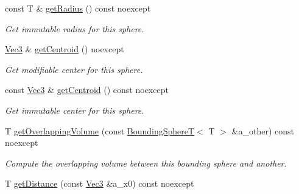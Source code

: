 \begin{DoxyCompactItemize}
\mbox{\label{classBoundingVolumes_1_1BoundingSphereT_affac2a4ac0cefaada01c5532eb13f26a}} 
const T \& \hyperlink{classBoundingVolumes_1_1BoundingSphereT_affac2a4ac0cefaada01c5532eb13f26a}{get\+Radius} () const noexcept
\begin{DoxyCompactList}\small\item\em Get immutable radius for this sphere. \end{DoxyCompactList}\item 
\mbox{\label{classBoundingVolumes_1_1BoundingSphereT_ac3adb87ea4da98d70375e5806e8dfdc5}} 
\hyperlink{classBoundingVolumes_1_1BoundingSphereT_ad89ed315255abcde216e9ca1de3068ab}{Vec3} \& \hyperlink{classBoundingVolumes_1_1BoundingSphereT_ac3adb87ea4da98d70375e5806e8dfdc5}{get\+Centroid} () noexcept
\begin{DoxyCompactList}\small\item\em Get modifiable center for this sphere. \end{DoxyCompactList}\item 
\mbox{\label{classBoundingVolumes_1_1BoundingSphereT_a62e38a048c7aacd79aec8dcc251e3a65}} 
const \hyperlink{classBoundingVolumes_1_1BoundingSphereT_ad89ed315255abcde216e9ca1de3068ab}{Vec3} \& \hyperlink{classBoundingVolumes_1_1BoundingSphereT_a62e38a048c7aacd79aec8dcc251e3a65}{get\+Centroid} () const noexcept
\begin{DoxyCompactList}\small\item\em Get immutable center for this sphere. \end{DoxyCompactList}\item 
T \hyperlink{classBoundingVolumes_1_1BoundingSphereT_a4581b87c7a3ccd3b58168bfdae9436cb}{get\+Overlapping\+Volume} (const \hyperlink{classBoundingVolumes_1_1BoundingSphereT}{Bounding\+SphereT}$<$ T $>$ \&a\+\_\+other) const noexcept
\begin{DoxyCompactList}\small\item\em Compute the overlapping volume between this bounding sphere and another. \end{DoxyCompactList}\item 
T \hyperlink{classBoundingVolumes_1_1BoundingSphereT_a06ec858b7349e6a926ad476990c774cb}{get\+Distance} (const \hyperlink{classBoundingVolumes_1_1BoundingSphereT_ad89ed315255abcde216e9ca1de3068ab}{Vec3} \&a\+\_\+x0) const noexcept

\end{DoxyCompactItemize}
